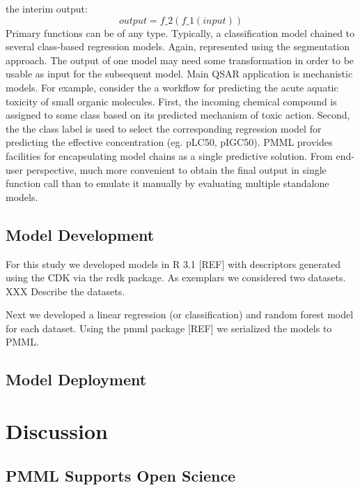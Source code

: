 \documentclass[12pt,letterpaper]{article}
\begin{document}
\begin{itemize}
  the interim output:
  \begin{equation}
    output = f\_2(f\_1(input))
  \end{equation}
  Primary functions can be of any type. Typically, a classification model chained to
  several class-based regression models. Again, represented using the segmentation
  approach. The output of one model may need some transformation in order to be
  usable as input for the subsequent model.
  Main QSAR application is mechanistic models. For example, consider the a workflow 
  for predicting the acute aquatic toxicity of small organic molecules. First, the
  incoming chemical compound is assigned to some class based on its predicted mechanism
  of toxic action. Second, the the class label is used to select the corresponding
  regression model for predicting the effective concentration (eg. pLC50, pIGC50).
  PMML provides facilities for encapsulating model chains as a single predictive 
  solution. From end-user perspective, much more convenient to obtain the final output
  in single function call than to emulate it manually by evaluating multiple 
  standalone models.
\end{itemize}

\subsection{Model Development}
\label{sec:model-development}

For this study we developed models in R 3.1 [REF] with descriptors
generated using the CDK \cite{Steinbeck:2003bh} via the rcdk
\cite{Guha:2007aa} package. As exemplars we considered two
datasets. XXX Describe the datasets.

Next we developed a linear regression (or classification) and random
forest  model  for each dataset. Using the pmml package [REF] we
serialized the models to PMML.

\subsection{Model Deployment}
\label{sec:model-deployment}

\section{Discussion}
\label{sec:discussion}

\subsection{PMML Supports Open Science}
\label{sec:pmml-supports-open}
\end{document}
